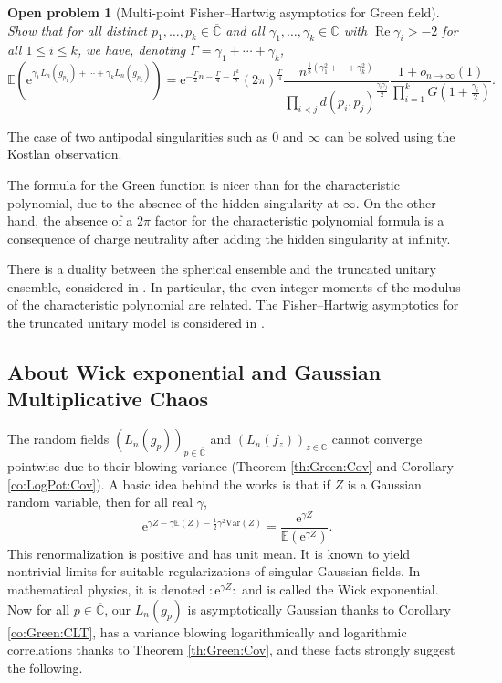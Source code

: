 \documentclass[10pt,reqno]{amsart}
\numberwithin{equation}{section}
\numberwithin{figure}{section}
\theoremstyle{plain}
\newtheorem{openproblem}[theorem]{Open problem}
\newcommand{\<}{\langle}
\renewcommand{\>}{\rangle}
\renewcommand{\Re}{\operatorname{Re}}
\begin{document}
\begin{openproblem}[Multi-point Fisher--Hartwig asymptotics for Green field]\label{op:Green:FH:mult}
Show that for all distinct $p_1,\ldots,p_k\in\overline{\mathbb{C}}$ and all $\gamma_1,\ldots,\gamma_k\in\mathbb{C}$ with $\Re\gamma_i>-2$ for all $1\leq i\leq k$, we have, denoting $\Gamma=\gamma_1+\cdots+\gamma_k$,
\begin{equation}\label{eq:Green:FH:mult}
    \mathbb{E}(\mathrm{e}^{\gamma_1L_n(g_{p_1})+\cdots+\gamma_kL_n(g_{p_k})})
=\mathrm{e}^{-\frac{\Gamma}{2}n-\frac{\Gamma}{4}-\frac{\Gamma^2}{8}}
(2\pi)^{\frac{\Gamma}{4}}
\frac{n^{\frac18(\gamma_1^2+\cdots+\gamma_k^2)}}
{\prod_{i<j}d(p_i,p_j)^{\frac{\gamma_i\gamma_j}{2}}}
\frac{1+o_{n\to\infty}(1)}
{\prod_{i=1}^kG\left(1+\frac{\gamma_i}{2}\right)}.
\end{equation}
\end{openproblem}

The case of two antipodal singularities such as $0$ and $\infty$ can be solved using the Kostlan observation.

The formula for the Green function is nicer than for the characteristic polynomial, due to the absence of the hidden singularity at $\infty$. On the other hand, the absence of a $2\pi$ factor for the characteristic polynomial formula is a consequence of charge neutrality after adding the hidden singularity at infinity.

There is a duality between the spherical ensemble and the truncated unitary ensemble, considered in \cite[Prop.~5.3~and~5.4]{forrester2025dualitiesrandommatrixtheory}. In particular, the even integer moments of the modulus of the characteristic polynomial are related. The Fisher--Hartwig asymptotics for the truncated unitary model is considered in \cite{deano2025asymptoticsclassplanarorthogonal}.
%

\subsection{About Wick exponential and Gaussian Multiplicative Chaos}

The random fields ${(L_n(g_p))}_{p\in\overline{\mathbb{C}}}$ and ${(L_n(f_z))}_{z\in\mathbb{C}}$ cannot converge pointwise due to their blowing variance (Theorem \ref{th:Green:Cov} and Corollary \ref{co:LogPot:Cov}). A basic idea behind the works \cite{zbMATH03960673,zbMATH06370363} is that if $Z$ is a Gaussian random variable, then for all real $\gamma$,
\begin{equation}
    \mathrm{e}^{\gamma Z-\gamma\mathbb{E}(Z)-\frac{1}{2}\gamma^2\mathrm{Var}(Z)}
    =\frac{\mathrm{e}^{\gamma Z}}{\mathbb{E}(\mathrm{e}^{\gamma Z})}.
\end{equation}
This renormalization is positive and has unit mean. It is known to yield nontrivial limits for suitable regularizations of singular Gaussian fields. In mathematical physics, it is denoted $:\mathrm{e}^{\gamma Z}:$ and is called the Wick exponential. Now for all $p\in\overline{\mathbb{C}}$, our $L_n(g_p)$ is asymptotically Gaussian thanks to Corollary \ref{co:Green:CLT}, has a variance blowing logarithmically and logarithmic correlations thanks to Theorem \ref{th:Green:Cov}, and these facts strongly suggest the following.
\end{document}
